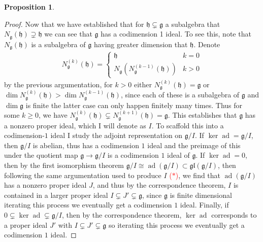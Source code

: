 \documentclass[10.5pt]{article}
\theoremstyle{definition}
\newtheorem{proposition}{Proposition}
\numberwithin{example}{subsection}
\numberwithin{pb}{subsection}
\begin{document}
\begin{proposition}
\begin{proof}
                Now that we have established that for \(\mathfrak{h} \subsetneq \mathfrak{g}\) a subalgebra that \(N_\mathfrak{g}(\mathfrak{h}) \supsetneq \mathfrak{h}\) we can see that \(\mathfrak{g}\) has a codimension 1 ideal. To see this, note that \(N_\mathfrak{g}(\mathfrak{h})\) is a subalgebra of \(\mathfrak{g}\) having greater dimension that \(\mathfrak{h}\). Denote
                \begin{align}
                    N^{(k)}_{\mathfrak{g}}(\mathfrak{h}) = \begin{cases}
                        \mathfrak{h} & k = 0 \\
                        N_\mathfrak{g}(N^{(k-1)}_{\mathfrak{g}}(\mathfrak{h})) & k > 0
                    \end{cases}
                \end{align}
                by the previous argumentation, for \(k > 0\) either \(N^{(k)}_\mathfrak{g}(\mathfrak{h}) = \mathfrak{g}\) or \(\dim N^{(k)}_\mathfrak{g}(\mathfrak{h}) > \dim N^{(k-1)}_\mathfrak{g}(\mathfrak{h})\), since each of these is a subalgebra of \(\mathfrak{g}\) and \(\dim \mathfrak{g}\) is finite the latter case can only happen finitely many times. Thus for some \(k \geq 0\), we have \(N_\mathfrak{g}^{(k)}(\mathfrak{h}) \subsetneq N_\mathfrak{g}^{(k+1)}(\mathfrak{h}) = \mathfrak{g}\). This establishes that \(\mathfrak{g}\) has a nonzero proper ideal, which I will denote as \(I\). To scaffold this into a codimension-\(1\) ideal I study the adjoint representation on \(\mathfrak{g}/I\). If \(\ker \operatorname{ad} = \mathfrak{g}/I\), then \(\mathfrak{g}/I\) is abelian, thus has a codimension \(1\) ideal and the preimage of this under the quotient map \(\mathfrak{g} \to \mathfrak{g}/I\) is a codimension \(1\) ideal of \(\mathfrak{g}\). If \(\ker \operatorname{ad} = 0\), then by the first isomorphism theorem \(\mathfrak{g}/I \cong \operatorname{ad}(\mathfrak{g}/I) \subset \mathfrak{gl}(\mathfrak{g}/I)\), then following the same argumentation used to produce \(I\) \textcolor{red}{(\(*\))}, we find that \(\operatorname{ad}(\mathfrak{g}/I)\) has a nonzero proper ideal \(J\), and thus by the correspondence theorem, \(I\) is contained in a larger proper ideal \(I \subsetneq J' \subsetneq \mathfrak{g}\), since \(\mathfrak{g}\) is finite dimensional iterating this process we eventually get a codimension \(1\) ideal. Finally, if \(0 \subsetneq \ker \operatorname{ad} \subsetneq \mathfrak{g}/I\), then by the correspondence theorem, \(\ker \operatorname{ad}\) corresponds to a proper ideal \(J'\) with \(I \subsetneq J' \subsetneq \mathfrak{g}\) so iterating this process we eventually get a codimension \(1\) ideal.


\end{proof}
\end{proposition}
\end{document}
